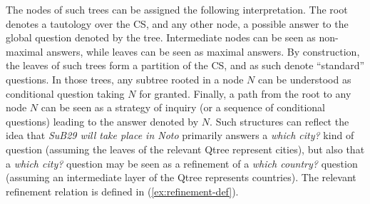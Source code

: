 \begin{exe}
	\label{ex:qtree-def}
\end{exe}

The nodes of such trees can be assigned the following interpretation. The root denotes a tautology over the CS, and any other node, a possible answer to the global question denoted by the tree. Intermediate nodes can be seen as non-maximal answers, while leaves can be seen as maximal answers. By construction, the leaves of such trees form a partition of the CS, and as such denote ``standard'' questions. In those trees, any subtree rooted in a node $N$ can be understood as conditional question taking $N$ for granted. Finally, a path from the root to any node $N$ can be seen as a strategy of inquiry (or a sequence of conditional questions) leading to the answer denoted by $N$. Such structures can reflect the idea that \textit{SuB29 will take place in Noto} primarily answers a \textit{which city?} kind of question (assuming the leaves of the relevant Qtree represent cities), but also that a \textit{which city?} question may be seen as a refinement of a \textit{which country?} question (assuming an intermediate layer of the Qtree represents countries). The relevant refinement relation is defined in (\ref{ex:refinement-def}).
\begin{exe}
	\label{ex:refinement-def}
\end{exe}


